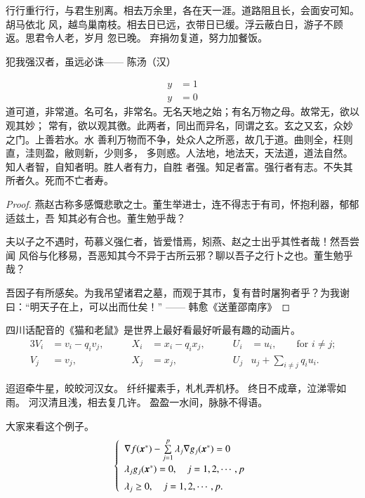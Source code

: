 行行重行行，与君生别离。相去万余里，各在天一涯。道路阻且长，会面安可知。胡马依北
风，越鸟巢南枝。相去日已远，衣带日已缓。浮云蔽白日，游子不顾返。思君令人老，岁月
忽已晚。  弃捐勿复道，努力加餐饭。

\begin{theorem}\label{the:theorem1}
犯我强汉者，虽远必诛\hfill —— 陈汤（汉）
\end{theorem}
\begin{subequations}
\begin{align}
y & = 1 \\
y & = 0
\end{align}
\end{subequations}
道可道，非常道。名可名，非常名。无名天地之始；有名万物之母。故常无，欲以观其妙；
常有，欲以观其徼。此两者，同出而异名，同谓之玄。玄之又玄，众妙之门。上善若水。水
善利万物而不争，处众人之所恶，故几于道。曲则全，枉则直，洼则盈，敝则新，少则多，
多则惑。人法地，地法天，天法道，道法自然。知人者智，自知者明。胜人者有力，自胜
者强。知足者富。强行者有志。不失其所者久。死而不亡者寿。

\begin{proof}
燕赵古称多感慨悲歌之士。董生举进士，连不得志于有司，怀抱利器，郁郁适兹土，吾
知其必有合也。董生勉乎哉？

夫以子之不遇时，苟慕义强仁者，皆爱惜焉，矧燕、赵之士出乎其性者哉！然吾尝闻
风俗与化移易，吾恶知其今不异于古所云邪？聊以吾子之行卜之也。董生勉乎哉？

吾因子有所感矣。为我吊望诸君之墓，而观于其市，复有昔时屠狗者乎？为我谢
曰：“明天子在上，可以出而仕矣！” \hfill—— 韩愈《送董邵南序》
\end{proof}

\begin{corollary}
  四川话配音的《猫和老鼠》是世界上最好看最好听最有趣的动画片。
\begin{alignat}{3}
V_i & =v_i - q_i v_j, & \qquad X_i & = x_i - q_i x_j,
 & \qquad U_i & = u_i,
 \qquad \text{for $i\ne j$;}\label{eq:B}\\
V_j & = v_j, & \qquad X_j & = x_j,
  & \qquad U_j & u_j + \sum_{i\ne j} q_i u_i.
\end{alignat}
\end{corollary}

迢迢牵牛星，皎皎河汉女。
纤纤擢素手，札札弄机杼。
终日不成章，泣涕零如雨。
河汉清且浅，相去复几许。
盈盈一水间，脉脉不得语。

\begin{example}
  大家来看这个例子。
\begin{equation}
\label{ktc}
\left\{\begin{array}{l}
\nabla f({\mbox{\boldmath $x$}}^*)-\sum\limits_{j=1}^p\lambda_j\nabla g_j({\mbox{\boldmath $x$}}^*)=0\\[0.3cm]
\lambda_jg_j({\mbox{\boldmath $x$}}^*)=0,\quad j=1,2,\cdots,p\\[0.2cm]
\lambda_j\ge 0,\quad j=1,2,\cdots,p.
\end{array}\right.
\end{equation}
\end{example}

